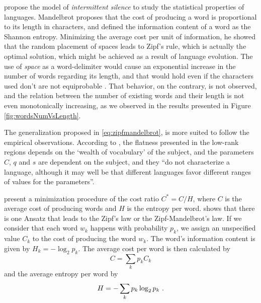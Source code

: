 \cite{miller1957,mandelbrot1965} propose the model of \textit{intermittent silence} to
study the statistical properties of languages. Mandelbrot proposes 
that the cost of producing a word is proportional to its length in characters,
and defined the information content of a word as the Shannon entropy.
Minimizing the average cost per unit of information, he showed that the
random placement of spaces leads to Zipf's rule, which is actually the optimal
solution, which might be achieved as a result of language evolution.
The use of \textit{space} as a word-delimiter 
would cause an exponential increase in the number of words regarding
its length, and that would hold even if the characters used don't
are not equiprobable \citep{li1992}. That behavior, on the contrary, is not
observed, and the relation between the number of existing words
and their length is not even monotonically increasing, as we observed 
in the results presented in Figure \ref{fig:wordsNumVsLength}.

The generalization proposed in \ref{eq:zipfmandelbrot}, is more suited to
follow the empirical observations. According to \cite{mandelbrot1965},
the flatness presented in the low-rank regions depends on the `wealth 
of vocabulary' of the subject, and the parameters $C$, $q$ and $s$
are dependent on the subject, and they ``do not characterize a language,
although it may well be that different languages favor different ranges
of values for the parameters''.

\cite{manin2009} present a minimization procedure of the cost ratio
$C^\ast = C/H$, where $C$ is the average cost of producing words 
and $H$ is the entropy per word. \cite{manin2009} shows that there is one
Ansatz that leads to the Zipf's law or the Zipf-Mandelbrot's law. 
If we consider that each word $w_k$ happens with probability $p_k$,
we assign an unspecified value $C_k$ to the cost of producing the word $w_k$.
The word's information content is given by $H_k = - \log_2 p_k$. 
The average cost per word is then calculated by
\begin{equation}
C = \sum_k p_k C_k
\end{equation}
and the average entropy per word by
\begin{equation}
H = - \sum_k p_k \log_2 p_k \textmd{ .}
\end{equation}

